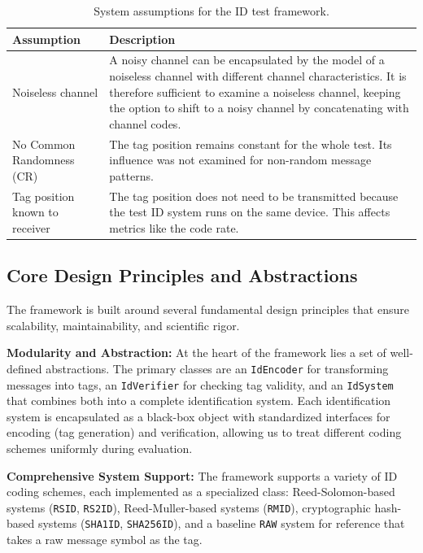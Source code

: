 \documentclass[english,BCOR=4mm,cdfont=false]{tudscrreprt} %
\begin{document}
\begin{table}[hbt!]
\centering
\caption{System assumptions for the ID test framework.}
\label{tab:sysAssum}
\begin{tabularx}{\textwidth}{@{}lX@{}}
\toprule
\textbf{Assumption} & \textbf{Description} \\
\midrule
Noiseless channel & A noisy channel can be encapsulated by the model of a noiseless channel with different channel characteristics. It is therefore sufficient to examine a noiseless channel, keeping the option to shift to a noisy channel by concatenating with channel codes. \\
\addlinespace
No Common Randomness (CR) & The tag position remains constant for the whole test. Its influence was not examined for non-random message patterns.\\
\addlinespace
Tag position known to receiver & The tag position does not need to be transmitted because the test ID system runs on the same device. This affects metrics like the code rate. \\
\bottomrule
\end{tabularx}
\end{table}

\subsection{Core Design Principles and Abstractions}
The framework is built around several fundamental design principles that ensure scalability, maintainability, and scientific rigor. 

\textbf{Modularity and Abstraction:} At the heart of the framework lies a set of well-defined abstractions. The primary classes are an \texttt{IdEncoder} for transforming messages into tags, an \texttt{IdVerifier} for checking tag validity, and an \texttt{IdSystem} that combines both into a complete identification system. Each identification system is encapsulated as a black-box object with standardized interfaces for encoding (tag generation) and verification, allowing us to treat different coding schemes uniformly during evaluation.

\textbf{Comprehensive System Support:} The framework supports a variety of ID coding schemes, each implemented as a specialized class: Reed-Solomon-based systems (\texttt{RSID}, \texttt{RS2ID}), Reed-Muller-based systems (\texttt{RMID}), cryptographic hash-based systems (\texttt{SHA1ID}, \texttt{SHA256ID}), and a baseline \texttt{RAW} system for reference that takes a raw message symbol as the tag.
\end{document}
